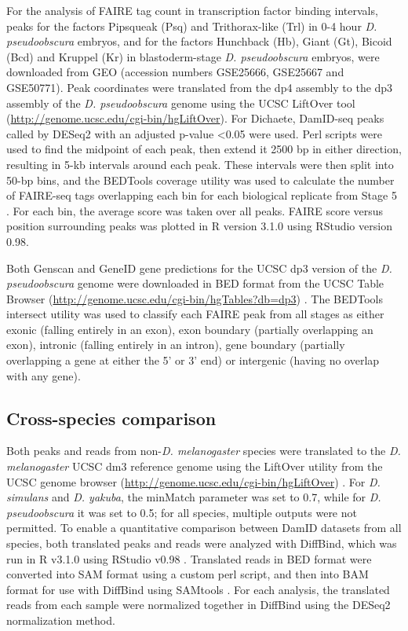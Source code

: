 For the analysis of FAIRE tag count in transcription factor binding intervals, peaks for the factors Pipsqueak (Psq) and Trithorax-like (Trl) in 0-4 hour \emph{D. pseudoobscura} embryos, and for the factors Hunchback (Hb), Giant (Gt), Bicoid (Bcd) and Kruppel (Kr) in blastoderm-stage \emph{D. pseudoobscura} embryos, were downloaded from GEO (accession numbers GSE25666, GSE25667 and GSE50771). Peak coordinates were translated from the dp4 assembly to the dp3 assembly of the \emph{D. pseudoobscura} genome using the UCSC LiftOver tool (\url{http://genome.ucsc.edu/cgi-bin/hgLiftOver}). For Dichaete, DamID-seq peaks called by DESeq2 with an adjusted p-value \textless 0.05 were used. Perl scripts were used to find the midpoint of each peak, then extend it 2500 bp in either direction, resulting in 5-kb intervals around each peak. These intervals were then split into 50-bp bins, and the BEDTools coverage utility was used to calculate the number of FAIRE-seq tags overlapping each bin for each biological replicate from Stage 5 \citep{quinlan_bedtools:_2010}. For each bin, the average score was taken over all peaks. FAIRE score versus position surrounding peaks was plotted in R version 3.1.0 using RStudio version 0.98.

Both Genscan and GeneID gene predictions for the UCSC dp3 version of the \emph{D. pseudoobscura} genome were downloaded in BED format from the UCSC Table Browser (\url{http://genome.ucsc.edu/cgi-bin/hgTables?db=dp3}) \citep{burge_prediction_1997,karolchik_ucsc_2004, karolchik_ucsc_2014,parra_geneid_2000}. The BEDTools intersect utility \citep{quinlan_bedtools:_2010} was used to classify each FAIRE peak from all stages as either exonic (falling entirely in an exon), exon boundary (partially overlapping an exon), intronic (falling entirely in an intron), gene boundary (partially overlapping a gene at either the 5' or 3' end) or intergenic (having no overlap with any gene).

\subsection{Cross-species comparison}
Both peaks and reads from non-\emph{D. melanogaster} species were translated to the \emph{D. melanogaster} UCSC dm3 reference genome using the LiftOver utility from the UCSC genome browser (\url{http://genome.ucsc.edu/cgi-bin/hgLiftOver}) \citep{bardet_computational_2011}. For \emph{D. simulans} and \emph{D. yakuba}, the minMatch parameter was set to 0.7, while for \emph{D. pseudoobscura} it was set to 0.5; for all species, multiple outputs were not permitted. To enable a quantitative comparison between DamID datasets from all species, both translated peaks and reads were analyzed with DiffBind, which was run in R v3.1.0 using RStudio v0.98 \citep{ross-innes_differential_2012}. Translated reads in BED format were converted into SAM format using a custom perl script, and then into BAM format for use with DiffBind using SAMtools \citep{li_sequence_2009}. For each analysis, the translated reads from each sample were normalized together in DiffBind using the DESeq2 normalization method. 

